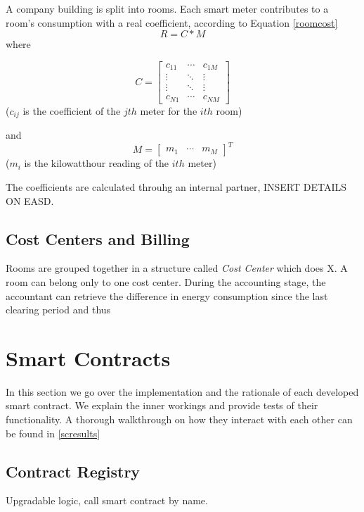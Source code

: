 A company building is split into rooms. Each smart meter contributes to a room's consumption with a real coefficient, according to Equation \ref{roomcost}
\begin{equation}\label{roomcost}
R = C * M
\end{equation}
\noindent where
\begin{description}
\item  \[C = 
\begin{bmatrix}
    c_{11} & \cdots & c_{1M} \\
    \vdots & \ddots & \vdots \\ 
    \vdots & \ddots & \vdots \\
    c_{N1} & \cdots & c_{NM}
  \end{bmatrix}\] ($c_{ij}$ is the coefficient of the $jth$ meter for the $ith$ room)

\item  and \[M = 
\begin{bmatrix}
    m_{1} & \cdots & m_{M}
\end{bmatrix}^T\] ($m_{i}$ is the kilowatthour reading of the $ith$ meter)
\end{description}

The coefficients are calculated throuhg an internal partner, INSERT DETAILS ON EASD.

\subsection{Cost Centers and Billing}

Rooms are grouped together in a structure called \textit{Cost Center} which does X. A room can belong only to one cost center. During the accounting stage, the accountant can retrieve the difference in energy consumption since the last clearing period and thus


\section{Smart Contracts}

In this section we go over the implementation and the rationale of each developed smart contract. We explain the inner workings and provide tests of their functionality. A thorough walkthrough on how they interact with each other can be found in \ref{scresults}
\subsection{Contract Registry}
Upgradable logic, call smart contract by name.

